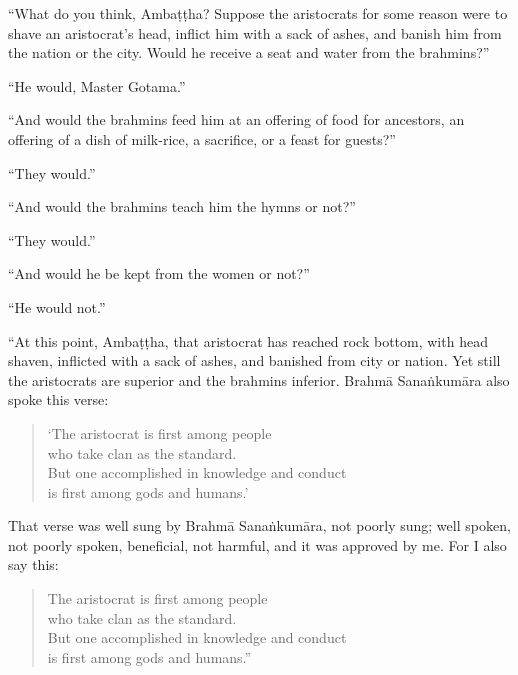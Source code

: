 \documentclass[12pt,openany]{book}%
\begin{document}
“What do you think, \textsanskrit{Ambaṭṭha}? Suppose the aristocrats for some reason were to shave an aristocrat’s head, inflict him with a sack of ashes, and banish him from the nation or the city. Would he receive a seat and water from the brahmins?” 

“He would, Master Gotama.” 

“And would the brahmins feed him at an offering of food for ancestors, an offering of a dish of milk-rice, a sacrifice, or a feast for guests?” 

“They would.” 

“And would the brahmins teach him the hymns or not?” 

“They would.” 

“And would he be kept from the women or not?” 

“He would not.” 

“At this point, \textsanskrit{Ambaṭṭha}, that aristocrat has reached rock bottom, with head shaven, inflicted with a sack of ashes, and banished from city or nation. Yet still the aristocrats are superior and the brahmins inferior. \textsanskrit{Brahmā} \textsanskrit{Sanaṅkumāra} also spoke this verse: 

\begin{verse}%
‘The aristocrat is first among people \\
who take clan as the standard. \\
But one accomplished in knowledge and conduct \\
is first among gods and humans.’ 

%
\end{verse}

That verse was well sung by \textsanskrit{Brahmā} \textsanskrit{Sanaṅkumāra}, not poorly sung; well spoken, not poorly spoken, beneficial, not harmful, and it was approved by me. For I also say this: 

\begin{verse}%
The aristocrat is first among people \\
who take clan as the standard. \\
But one accomplished in knowledge and conduct \\
is first among gods and humans.” 

%
\end{verse}
\end{document}
